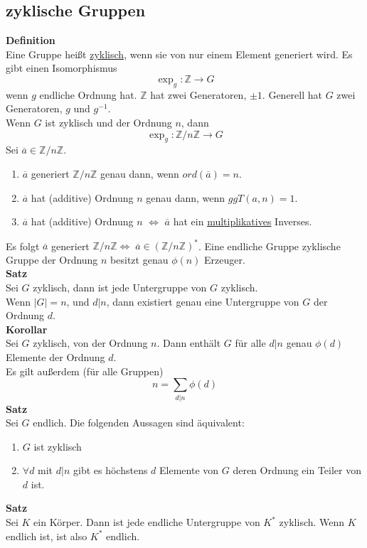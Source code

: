 \documentclass[a4paper, 12pt]{article}
\begin{document}
\subsection{zyklische Gruppen}
\textbf{Definition}\\
Eine Gruppe heißt \underline{zyklisch}, wenn sie von nur einem Element generiert wird. Es gibt einen Isomorphismus \[\exp_g: \mathbb{Z} \to G\] wenn $g$ endliche Ordnung hat. $\mathbb{Z}$ hat zwei Generatoren, $\pm1$. Generell hat $G$ zwei Generatoren, $g$ und $g^{-1}$.\\
Wenn $G$ ist zyklisch und der Ordnung $n$, dann \[\exp_g: \mathbb{Z}/n\mathbb{Z} \to G\]
Sei $\overline{a} \in \mathbb{Z}/n\mathbb{Z}$. \begin{enumerate}
	\item $\overline{a}$ generiert $\mathbb{Z}/n\mathbb{Z}$ genau dann, wenn $ord(\overline{a}) = n$.
	\item $\overline{a}$ hat (additive) Ordnung $n$ genau dann, wenn $ggT(a,n)=1$.
	\item $\overline{a}$ hat (additive) Ordnung $n$ $\Leftrightarrow$ $\overline{a}$ hat ein \underline{multiplikatives} Inverses. 
\end{enumerate}
Es folgt $\overline{a}$ generiert $\mathbb{Z}/n\mathbb{Z} \Leftrightarrow \; \overline{a} \in (\mathbb{Z}/n\mathbb{Z})^*$. Eine endliche Gruppe zyklische Gruppe der Ordnung $n$ besitzt genau $\phi(n)$ Erzeuger.\\
\textbf{Satz}\\
Sei $G$ zyklisch, dann ist jede Untergruppe von $G$ zyklisch.\\
Wenn $\left|G\right|=n$, und $d|n$, dann existiert genau eine Untergruppe von $G$ der Ordnung $d$.\\
\textbf{Korollar}\\
Sei $G$ zyklisch, von der Ordnung $n$. Dann enthält $G$ für alle $d|n$ genau $\phi(d)$ Elemente der Ordnung $d$.\\
Es gilt außerdem (für alle Gruppen) \[n = \sum_{d|n} \phi(d)\]
\textbf{Satz}\\
Sei $G$ endlich. Die folgenden Aussagen sind äquivalent:\begin{enumerate}
	\item $G$ ist zyklisch
	\item $\forall d$ mit $d|n$ gibt es höchstens $d$ Elemente von $G$ deren Ordnung ein Teiler von $d$ ist. 
\end{enumerate}
\textbf{Satz}\\
Sei $K$ ein Körper. Dann ist jede endliche Untergruppe von $K^*$ zyklisch. Wenn $K$ endlich ist, ist also $K^*$ endlich.\\
\end{document}
